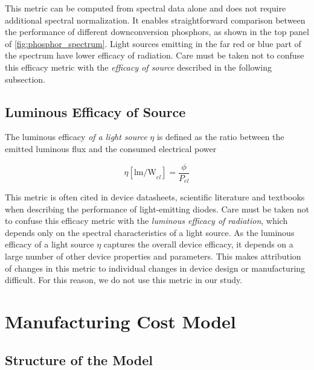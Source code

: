 \documentclass[10pt]{article}
\newcounter{defcounter}
\newenvironment{myequation}{%
\addtocounter{equation}{-1}
\refstepcounter{defcounter}
\renewcommand\theequation{SI\thedefcounter}
\begin{equation}}
{\end{equation}}
\begin{document}
This metric can be computed from spectral data alone and does not require additional spectral normalization. It enables straightforward comparison between the performance of different downconversion phosphors, as shown in the top panel of \cref{fig:phosphor_spectrum}. Light sources emitting in the far red or blue part of the spectrum have lower efficacy of radiation. Care must be taken not to confuse this efficacy metric with the \textit{efficacy of source} described in the following subsection.

\subsection{Luminous Efficacy of Source}
\label{subsec:les}

The luminous efficacy \textit{of a light source} $\eta$ is defined as the ratio between the emitted luminous flux and the consumed electrical power \cite{cie-term-effsrc}

\begin{myequation}
    \eta [\text{lm/W}_{el}]= \frac{\phi}{P_{el}}
\end{myequation}

This metric is often cited in device datasheets, scientific literature and textbooks when describing the performance of light-emitting diodes. Care must be taken not to confuse this efficacy metric with the \textit{luminous efficacy of radiation}, which depends only on the spectral characteristics of a light source. As the luminous efficacy of a light source $\eta$ captures the overall device efficacy, it depends on a large number of other device properties and parameters. This makes attribution of changes in this metric to individual changes in device design or manufacturing difficult. For this reason, we do not use this metric in our study.

\newpage
\section{Manufacturing Cost Model}
\label{sec:costmodel}

\subsection{Structure of the Model}
\end{document}
